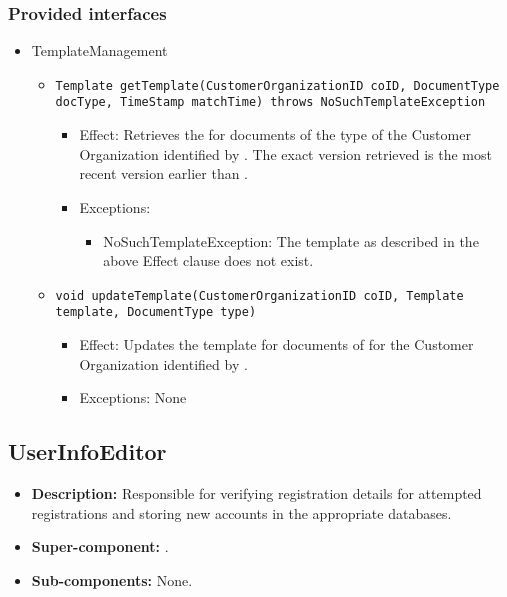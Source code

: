 \subsubsection*{Provided interfaces}
\begin{itemize}
    \item TemplateManagement
    \begin{itemize}
        \item \texttt{Template getTemplate(CustomerOrganizationID coID, DocumentType docType, TimeStamp matchTime) throws NoSuchTemplateException}
        \begin{itemize}
            \item Effect: Retrieves the  for documents of the type  of the Customer Organization identified by . The exact version retrieved is the most recent version earlier than .
            \item Exceptions:
            \begin{itemize}
                \item NoSuchTemplateException: The template as described in the above Effect clause does not exist.
            \end{itemize}
        \end{itemize}

		\item \texttt{void updateTemplate(CustomerOrganizationID coID, Template template, DocumentType type)}
		    \begin{itemize}
                \item Effect: Updates the template for documents of  for the Customer Organization identified by .
                \item Exceptions: None
            \end{itemize}
    \end{itemize}
\end{itemize}

\subsection{UserInfoEditor}
\begin{itemize}
    \item \textbf{Description:} Responsible for verifying registration details for attempted registrations and storing new accounts in the appropriate databases.
    \item \textbf{Super-component:} .
    \item \textbf{Sub-components:} None.
\end{itemize}

